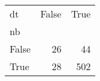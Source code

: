 \begin{tabular}{lrr}
\toprule
dt &  False &  True  \\
nb    &        &        \\
\midrule
False &     26 &     44 \\
True  &     28 &    502 \\
\bottomrule
\end{tabular}
